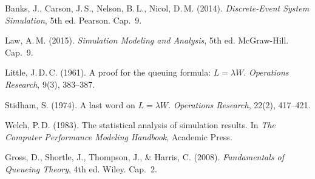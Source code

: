 \documentclass[11pt, letterpaper]{article}
\begin{document}
\begin{enumerate}[label={[\arabic*]}]
    \item Banks, J., Carson, J.\,S., Nelson, B.\,L., Nicol, D.\,M. (2014). \textit{Discrete-Event System Simulation}, 5th ed. Pearson. Cap.~9.
    \item Law, A.\,M. (2015). \textit{Simulation Modeling and Analysis}, 5th ed. McGraw-Hill. Cap.~9.
    \item Little, J.\,D.\,C. (1961). A proof for the queuing formula: $L = \lambda W$. \textit{Operations Research}, 9(3), 383--387.
    \item Stidham, S. (1974). A last word on $L = \lambda W$. \textit{Operations Research}, 22(2), 417--421.
    \item Welch, P.\,D. (1983). The statistical analysis of simulation results. In \textit{The Computer Performance Modeling Handbook}, Academic Press.
    \item Gross, D., Shortle, J., Thompson, J., \& Harris, C. (2008). \textit{Fundamentals of Queueing Theory}, 4th ed. Wiley. Cap.~2.
\end{enumerate}
\end{document}
